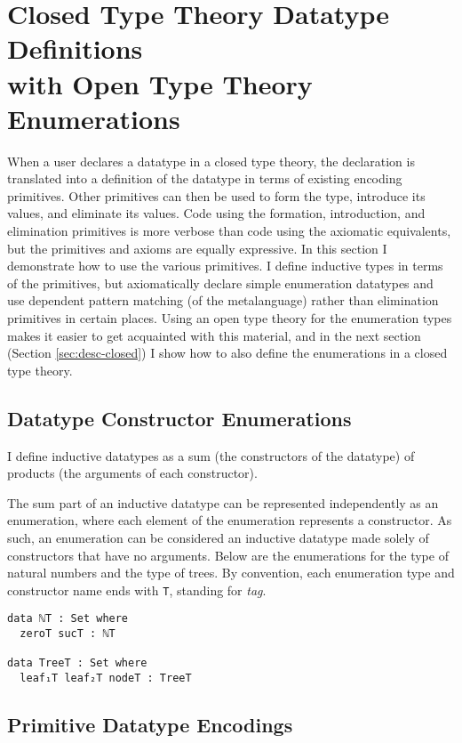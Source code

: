 \documentclass[runningheads,a4paper]{llncs}
\newcommand{\refsec}[1]{Section \ref{sec:#1}}
\begin{document}
\section{Closed Type Theory Datatype Definitions
  \\with Open Type Theory Enumerations}
\label{sec:desc-open}

When a user declares a datatype in a closed type theory, the
declaration is translated into a definition of the datatype in terms of
existing encoding primitives. Other primitives can then be used to form the
type, introduce its values, and eliminate its values. Code using the
formation, introduction, and elimination primitives is more verbose
than code using the axiomatic equivalents, but the primitives and
axioms are equally expressive. In this section I demonstrate how to
use the various primitives. I define inductive types in terms of
the primitives, but axiomatically declare simple enumeration datatypes
and use dependent pattern matching (of the metalanguage) rather than elimination primitives
in certain places. Using an open type theory for the enumeration types
makes it easier to get acquainted with this material, and in the next
section (\refsec{desc-closed}) I show how to also define the
enumerations in a closed type theory.

\subsection{Datatype Constructor Enumerations}

I define inductive datatypes as a sum (the constructors of the
datatype) of products (the arguments of each constructor). 

The sum part of an inductive datatype can be represented independently
as an enumeration, where each element of the enumeration represents a
constructor. As such, an enumeration can be considered an inductive datatype
made solely of constructors that have no arguments. Below are the
enumerations for the type of natural numbers and the type of trees. By
convention, each enumeration type and constructor name ends with
{\tt T}, standing for {\it tag}.

\begin{verbatim}
data ℕT : Set where
  zeroT sucT : ℕT

data TreeT : Set where
  leaf₁T leaf₂T nodeT : TreeT
\end{verbatim}

\subsection{Primitive Datatype Encodings}
\end{document}
